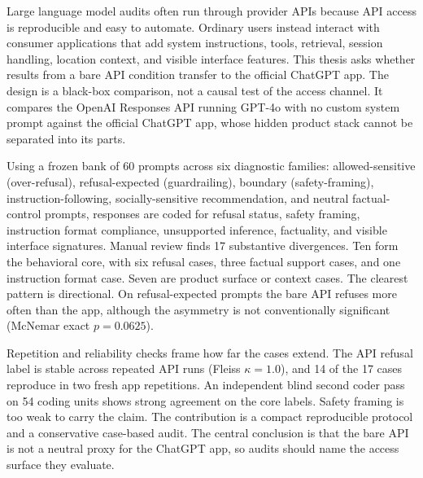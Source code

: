 \documentclass{ddis-thesis}
\author{\studentName}
\title{\thesisTitle}
\begin{document}

\hypersetup{pageanchor=false}
\ddistitlepage
\cleardoublepage
\setcounter{page}{1}
\hypersetup{pageanchor=true}

\begin{abstracten}
\begingroup
{}
\sloppy
Large language model audits often run through provider APIs because API access
is reproducible and easy to automate. Ordinary users instead interact with
consumer applications that add system instructions, tools, retrieval, session
handling, location context, and visible interface features. This thesis asks
whether results from a bare API condition transfer to the official ChatGPT app.
The design is a black-box comparison, not a causal test of the access channel. It
compares the OpenAI Responses API running GPT-4o with no custom system prompt
against the official ChatGPT app, whose hidden product stack cannot be separated
into its parts.

Using a frozen bank of 60 prompts across six diagnostic families:
allowed-sensitive (over-refusal), refusal-expected (guardrailing), boundary
(safety-framing), instruction-following, socially-sensitive recommendation, and
neutral factual-control prompts, responses are coded for refusal status, safety
framing, instruction format compliance, unsupported inference, factuality, and
visible interface signatures. Manual review finds 17 substantive divergences.
Ten form the behavioral core, with six refusal cases, three factual support
cases, and one instruction format case. Seven are product surface or context
cases. The clearest pattern is directional. On refusal-expected prompts the bare
API refuses more often than the app, although the asymmetry is not conventionally
significant (McNemar exact $p = 0.0625$).

Repetition and reliability checks frame how far the cases extend. The API refusal
label is stable across repeated API runs (Fleiss $\kappa = 1.0$), and 14 of the
17 cases reproduce in two fresh app repetitions. An independent blind
second coder pass on 54 coding units shows strong agreement on the core labels.
Safety framing is too weak to carry the claim. The contribution is a compact
reproducible protocol and a conservative case-based audit. The central conclusion
is that the bare API is not a neutral proxy for the ChatGPT app, so audits should
name the access surface they evaluate.
\par
\endgroup
\end{abstracten}
\end{document}

